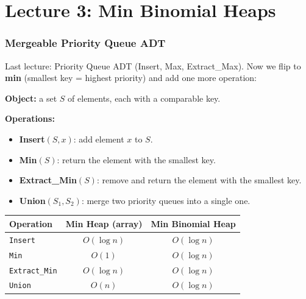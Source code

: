\documentclass[11pt]{article}
\begin{document}
\newpage


\part*{\textcolor{utnavy}{Lecture 3: Min Binomial Heaps}}

\section{Mergeable Priority Queue ADT}

Last lecture: Priority Queue ADT (Insert, Max, Extract\_Max). Now we flip to \textbf{min} (smallest key = highest priority) and add one more operation:

\begin{defbox}
\textbf{Object:} a set $S$ of elements, each with a comparable \textcolor{rustW}{key}.

\textbf{Operations:}
\begin{itemize}[leftmargin=1.4em,itemsep=1pt]
  \item \textbf{Insert}$(S, x)$: add element $x$ to $S$.
  \item \textbf{Min}$(S)$: return the element with the smallest key.
  \item \textbf{Extract\_Min}$(S)$: remove and return the element with the smallest key.
  \item \textbf{Union}$(S_1, S_2)$: merge two priority queues into a single one.
\end{itemize}
\end{defbox}

\begin{center}
\renewcommand{\arraystretch}{1.5}
\begin{tabular}{l c c}
\hline
\textbf{\textcolor{heapblue}{Operation}} & \textbf{Min Heap (array)} & \textbf{Min Binomial Heap}\\
\hline
\texttt{Insert} & $O(\log n)$ & $O(\log n)$\\
\texttt{Min} & \textcolor{greenO}{$O(1)$} & $O(\log n)$\\
\texttt{Extract\_Min} & $O(\log n)$ & $O(\log n)$\\
\texttt{Union} & \textcolor{rustW}{$O(n)$} & \textcolor{greenO}{$O(\log n)$}\\
\hline
\end{tabular}
\end{center}
\end{document}
